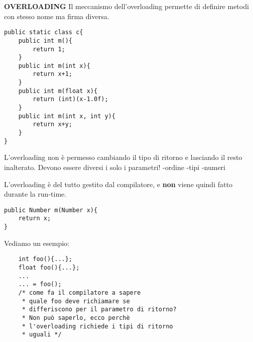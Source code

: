 \noindent \textbf{OVERLOADING} \newline
Il meccanismo dell'overloading permette di definire metodi con stesso nome ma firma diversa. 

\begin{lstlisting}
public static class c{
	public int m(){
		return 1;
	}
	public int m(int x){
		return x+1;
	}
	public int m(float x){
		return (int)(x-1.0f);
	}
	public int m(int x, int y){
		return x+y;
	}		
}
\end{lstlisting}

\noindent L'overloading non è permesso cambiando il tipo di ritorno e lasciando il resto inalterato. Devono essere diversi i solo i parametri! \newline
-ordine \newline
-tipi \newline
-numeri \newline

\noindent L'overloading è del tutto gestito dal compilatore, e \textbf{non} viene quindi fatto durante la run-time.

\begin{lstlisting}
public Number m(Number x){
	return x;
}
\end{lstlisting}
Vediamo un esempio:
\begin{lstlisting}
	int foo(){...};
	float foo(){...};
	...
	... = foo();
	/* come fa il compilatore a sapere
	 * quale foo deve richiamare se 
	 * differiscono per il parametro di ritorno? 
	 * Non può saperlo, ecco perchè 
	 * l'overloading richiede i tipi di ritorno
	 * uguali */
\end{lstlisting}























